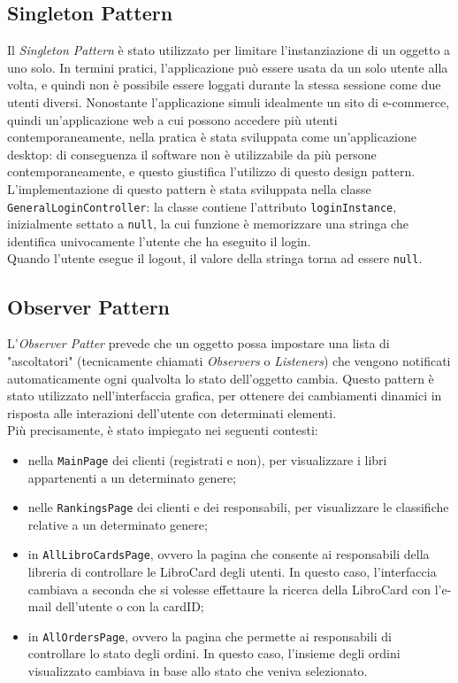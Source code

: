 \documentclass[12pt,a4paper]{article}
\begin{document}
	\subsection{Singleton Pattern}
	Il \textit{Singleton Pattern} è stato utilizzato per limitare l'instanziazione di un oggetto a uno solo. In termini pratici, l'applicazione può essere usata da un solo utente alla volta, e quindi non è possibile essere loggati durante la stessa sessione come due utenti diversi. Nonostante l'applicazione simuli idealmente un sito di e-commerce, quindi un'applicazione web a cui possono accedere più utenti contemporaneamente, nella pratica è stata sviluppata come un'applicazione desktop: di conseguenza il software non è utilizzabile da più persone contemporaneamente, e questo giustifica l'utilizzo di questo design pattern.
	L'implementazione di questo pattern è stata sviluppata nella classe \texttt{GeneralLoginController}: la classe contiene l'attributo \texttt{loginInstance}, inizialmente settato a \texttt{null}, la cui funzione è memorizzare una stringa che identifica univocamente l'utente che ha eseguito il login.\\
	Quando l'utente esegue il logout, il valore della stringa torna ad essere \texttt{null}.\\
	\subsection{Observer Pattern}
	L'\textit{Observer Patter} prevede che un oggetto possa impostare una lista di "ascoltatori" (tecnicamente chiamati \textit{Observers} o \textit{Listeners}) che vengono notificati automaticamente ogni qualvolta lo stato dell'oggetto cambia. 
	Questo pattern è stato utilizzato nell'interfaccia grafica, per ottenere dei cambiamenti dinamici in risposta alle interazioni dell'utente con determinati elementi. \\Più precisamente, è stato impiegato nei seguenti contesti:
	\begin{itemize}
		\item nella \texttt{MainPage} dei clienti (registrati e non), per visualizzare i libri appartenenti a un determinato genere;
		\item nelle \texttt{RankingsPage} dei clienti e dei responsabili, per visualizzare le classifiche relative a un determinato genere;
		\item in \texttt{AllLibroCardsPage}, ovvero la pagina che consente ai responsabili della libreria di controllare le LibroCard degli utenti. In questo caso, l'interfaccia cambiava a seconda che si volesse effettaure la ricerca della LibroCard con l'e-mail dell'utente o con la cardID;
		\item in \texttt{AllOrdersPage}, ovvero la pagina che permette ai responsabili di controllare lo stato degli ordini. In questo caso, l'insieme degli ordini visualizzato cambiava in base allo stato che veniva selezionato.
	\end{itemize}
\end{document}
